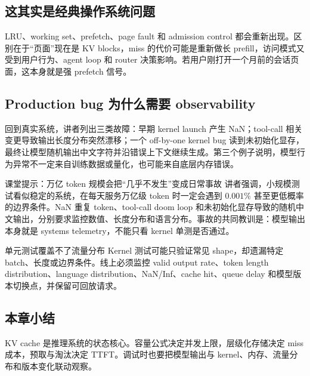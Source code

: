 \subsection{这其实是经典操作系统问题}

LRU、working set、prefetch、page fault 和 admission control 都会重新出现。区别在于“页面”现在是 KV blocks，miss 的代价可能是重新做长 prefill，访问模式又受到用户行为、agent loop 和 router 决策影响。若用户刚打开一个月前的会话页面，这本身就是强 prefetch 信号。


\subsection{Production bug 为什么需要 observability}

回到真实系统，讲者列出三类故障：早期 kernel launch 产生 NaN；tool-call 相关变更导致输出长度分布突然漂移；一个 off-by-one kernel bug 读到未初始化显存，最终让模型随机输出中文字符并沿错误上下文继续生成。第三个例子说明，模型行为异常不一定来自训练数据或量化，也可能来自底层内存错误。

\begin{knowledgebox}{课堂提示：万亿 token 规模会把“几乎不发生”变成日常事故}
讲者强调，小规模测试看似稳定的系统，在每天服务万亿级 token 时一定会遇到 $0.001\%$ 甚至更低概率的边界条件。NaN 重复 token、tool-call doom loop 和未初始化显存导致的随机中文输出，分别要求监控数值、长度分布和语言分布。事故的共同教训是：模型输出本身就是 systems telemetry，不能只看 kernel 单测是否通过。
\end{knowledgebox}

\begin{warningbox}{单元测试覆盖不了流量分布}
Kernel 测试可能只验证常见 shape，却遗漏特定 batch、长度或边界条件。线上必须监控 valid output rate、token length distribution、language distribution、NaN/Inf、cache hit、queue delay 和模型版本切换点，并保留可回放请求。
\end{warningbox}

\subsection{本章小结}

KV cache 是推理系统的状态核心。容量公式决定并发上限，层级化存储决定 miss 成本，预取与淘汰决定 TTFT。调试时也要把模型输出与 kernel、内存、流量分布和版本变化联动观察。

